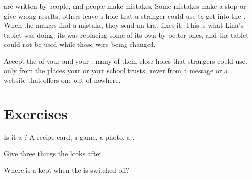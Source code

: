 are written by people, and people make mistakes. Some mistakes make
a  stop or give wrong results; others leave a hole that a stranger
could use to get into the . When the makers find a mistake, they send
an  that fixes it. This is what Lina's tablet was doing: its  was replacing some of its own  by better ones, and the tablet
could not be used while those  were being changed.

\begin{safety}
Accept the  of your  and your : many of
them close holes that strangers could use.   only from the
places your  or your school trusts, never from a message or a website
that offers one out of nowhere.
\end{safety}

\section{Exercises}

\begin{exercise}[$\star$]\label{exo:g4:programs-and-operating-system:1}
Is it a ? A recipe card, a game, a photo, a .
\end{exercise}

\begin{exercise}[$\star$]\label{exo:g4:programs-and-operating-system:2}
Give three things the  looks after.
\end{exercise}

\begin{exercise}[$\star$]\label{exo:g4:programs-and-operating-system:3}
Where is a  kept when the  is switched off?
\end{exercise}

